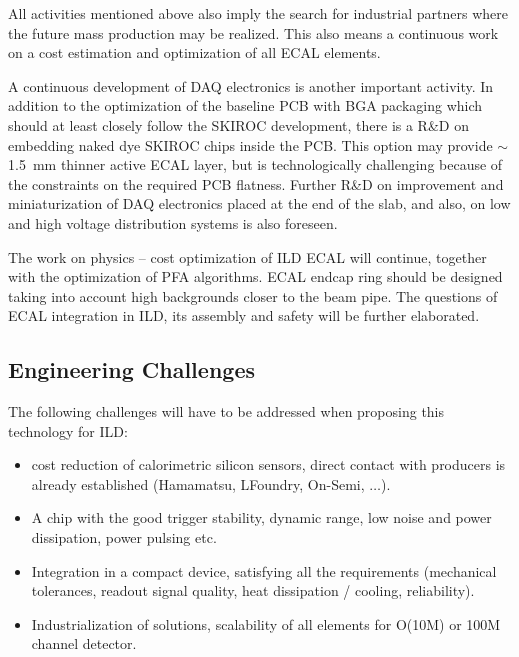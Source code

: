 All activities mentioned above also imply the search for industrial partners
where the future mass production may be realized. This also means a continuous
work on a cost estimation and optimization of all ECAL elements.

A continuous development of DAQ electronics is another important
activity. In addition to the optimization of the baseline PCB with BGA
packaging which should at least closely follow the SKIROC development, there
is a R\&D on embedding naked dye SKIROC chips inside the PCB. This option may
provide $\sim$\SI{1.5}{mm} thinner active ECAL layer, but is technologically
challenging because of the constraints on the required PCB flatness. Further
R\&D on improvement and miniaturization of DAQ electronics placed at the end
of the slab, and also, on low and high voltage distribution systems is also
foreseen.

The work on physics -- cost optimization of ILD ECAL will continue, together
with the optimization of PFA algorithms. ECAL endcap ring should be designed
taking into account high backgrounds closer to the beam pipe. The questions of
ECAL integration in ILD, its assembly and safety will be further elaborated.

\subsection{Engineering Challenges}
The following challenges will have to be addressed when proposing this
technology for ILD:
\begin{itemize}
\item cost reduction of calorimetric silicon sensors, direct contact
 with producers is already established (Hamamatsu, LFoundry, On-Semi, $\ldots$).
\item A chip with the good trigger stability, dynamic range, low noise and
 power dissipation, power pulsing etc.
\item Integration in a compact device, satisfying all the requirements
 (mechanical tolerances, readout signal quality, heat dissipation / cooling,
 reliability).
\item Industrialization of solutions, scalability of all elements for O(10M)
 or 100M channel detector.
\end{itemize}
